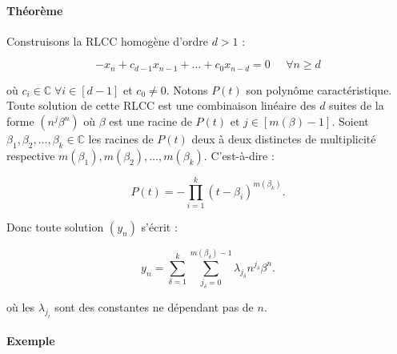 \documentclass{article}
\begin{document}
			\paragraph{Théorème} Construisons la RLCC homogène d'ordre $d > 1$ :

			\[-x_n + c_{d-1}x_{n-1} + \ldots + c_0x_{n-d} = 0 \;\;\;\;\;\forall n \geq d\]

			où $c_i \in \mathbb C \; \forall i \in [d-1]$ et $c_0 \neq 0$. Notons $P(t)$ son polynôme caractéristique. Toute solution de cette RLCC est une combinaison linéaire
			des $d$ suites de la forme $(n^j\beta^n)$ où $\beta$ est une racine de $P(t)$ et $j \in [m(\beta)-1]$. Soient $\beta_1, \beta_2, \ldots, \beta_k \in \mathbb C$ les racines
			de $P(t)$ deux à deux distinctes de multiplicité respective $m(\beta_1), m(\beta_2), \ldots, m(\beta_k)$. C'est-à-dire :

			\[P(t) = -\prod_{i=1}^k(t-\beta_i)^{m(\beta_k)}.\]

			Donc toute solution $(y_n)$ s'écrit :

			\[y_n = \sum_{\delta=1}^k\sum_{j_\delta=0}^{m(\beta_\delta)-1}\lambda_{j_\delta}n^{j_\delta}\beta^n.\]

			où les $\lambda_{j_i}$ sont des constantes ne dépendant pas de $n$.

			\paragraph{Exemple}
\end{document}

